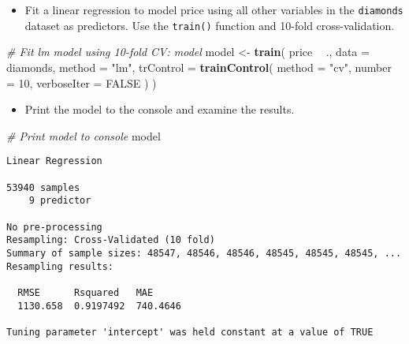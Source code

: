 \documentclass[]{book}
\newenvironment{Shaded}{\begin{snugshade}}{\end{snugshade}}
\newcommand{\KeywordTok}[1]{\textcolor[rgb]{0.13,0.29,0.53}{\textbf{#1}}}
\newcommand{\DataTypeTok}[1]{\textcolor[rgb]{0.13,0.29,0.53}{#1}}
\newcommand{\DecValTok}[1]{\textcolor[rgb]{0.00,0.00,0.81}{#1}}
\newcommand{\StringTok}[1]{\textcolor[rgb]{0.31,0.60,0.02}{#1}}
\newcommand{\CommentTok}[1]{\textcolor[rgb]{0.56,0.35,0.01}{\textit{#1}}}
\newcommand{\OtherTok}[1]{\textcolor[rgb]{0.56,0.35,0.01}{#1}}
\newcommand{\OperatorTok}[1]{\textcolor[rgb]{0.81,0.36,0.00}{\textbf{#1}}}
\newcommand{\NormalTok}[1]{#1}
\providecommand{\tightlist}{%
  \setlength{\itemsep}{0pt}\setlength{\parskip}{0pt}}
\begin{document}
\begin{itemize}
\tightlist
\item
  Fit a linear regression to model price using all other variables in
  the \texttt{diamonds} dataset as predictors. Use the \texttt{train()}
  function and 10-fold cross-validation.
\end{itemize}

\begin{Shaded}
\begin{Highlighting}[]
\CommentTok{# Fit lm model using 10-fold CV: model}
\NormalTok{model <-}\StringTok{ }\KeywordTok{train}\NormalTok{(}
\NormalTok{  price }\OperatorTok{~}\StringTok{ }\NormalTok{., }\DataTypeTok{data =}\NormalTok{ diamonds,}
  \DataTypeTok{method =} \StringTok{"lm"}\NormalTok{,}
  \DataTypeTok{trControl =} \KeywordTok{trainControl}\NormalTok{(}
    \DataTypeTok{method =} \StringTok{"cv"}\NormalTok{, }\DataTypeTok{number =} \DecValTok{10}\NormalTok{,}
    \DataTypeTok{verboseIter =} \OtherTok{FALSE}
\NormalTok{  )}
\NormalTok{)}
\end{Highlighting}
\end{Shaded}

\begin{itemize}
\tightlist
\item
  Print the model to the console and examine the results.
\end{itemize}

\begin{Shaded}
\begin{Highlighting}[]
\CommentTok{# Print model to console}
\NormalTok{model}
\end{Highlighting}
\end{Shaded}

\begin{verbatim}
Linear Regression 

53940 samples
    9 predictor

No pre-processing
Resampling: Cross-Validated (10 fold) 
Summary of sample sizes: 48547, 48546, 48546, 48545, 48545, 48545, ... 
Resampling results:

  RMSE      Rsquared   MAE     
  1130.658  0.9197492  740.4646

Tuning parameter 'intercept' was held constant at a value of TRUE
\end{verbatim}

\begin{Shaded}
\end{Shaded}
\end{document}

